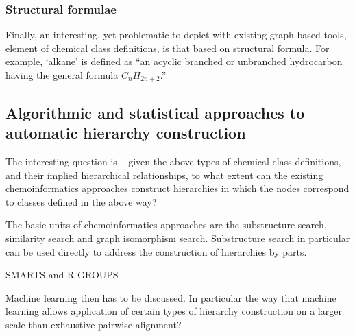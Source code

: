 \documentclass[10pt]{bmc_article}
\newenvironment{bmcformat}{\baselineskip20pt\sloppy\setboolean{publ}{false}}{\baselineskip20pt\sloppy}
\begin{document}
\begin{bmcformat}



\subsubsection*{Structural formulae}
\label{sec:molformula}

Finally, an interesting, yet problematic to depict with existing graph-based tools, element of chemical class definitions, is that based on structural formula. For example, `alkane' is defined as ``an acyclic branched or unbranched hydrocarbon having the general formula $C_{n}H_{2n+2}$.'' 




\subsection*{Algorithmic and statistical approaches to automatic hierarchy construction}
\label{sec:resultscheminf}


The interesting question is -- given the above types of chemical class definitions, and their implied hierarchical relationships, to what extent can the existing chemoinformatics approaches construct hierarchies in which the nodes correspond to classes defined in the above way? 

The basic units of chemoinformatics approaches are the substructure search, similarity search and graph isomorphism search.  Substructure search in particular can be used directly to address the construction of hierarchies by parts. 

SMARTS and R-GROUPS

Machine learning then has to be discussed.  In particular the way that machine learning allows application of certain types of hierarchy construction on a larger scale than exhaustive pairwise alignment?  


\end{bmcformat}
\end{document}
